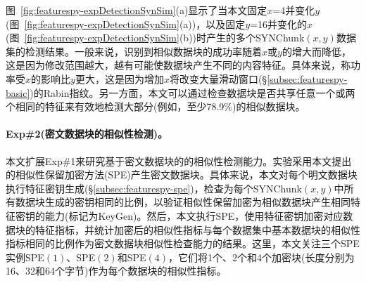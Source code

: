 图~\ref{fig:featurespy-expDetectionSynSim}(a)显示了当本文固定$x$=4并变化$y$(图~\ref{fig:featurespy-expDetectionSynSim}(a))，以及固定$y$=16并变化的$x$(图~\ref{fig:featurespy-expDetectionSynSim}(b))时产生的多个SYNChunk$(x, y)$数据集的检测结果。一般来说，识别到相似数据块的成功率随着$x$或$y$的增大而降低，这是因为修改范围越大，越有可能使数据块产生不同的内容特征。具体来说，称功率受$x$的影响比$y$更大，这是因为增加$x$将改变大量滑动窗口(\S\ref{subsec:featurespy-basic})的Rabin指纹。另一方面，本文可以通过检查数据块是否共享任意一个或两个相同的特征来有效地检测大部分(例如，至少78.9\%)的相似数据块。

\paragraph*{Exp\#2(密文数据块的相似性检测)。}
本文扩展Exp\#1来研究\sysnameF 基于密文数据块的的相似性检测能力。实验采用本文提出的相似性保留加密方法(SPE)产生密文数据块。具体来说，本文对每个明文数据块执行特征密钥生成(\S\ref{subsec:featurespy-spe})，检查为每个SYNChunk$(x, y)$中所有数据块生成的密钥相同的比例，以验证相似性保留加密为相似数据块产生相同特征密钥的能力(标记为KeyGen)。然后，本文执行SPE，使用特征密钥加密对应数据块的特征指标，并统计加密后的相似性指标与每个数据集中基本数据块的相似性指标相同的比例作为密文数据块相似性检查能力的结果。这里，本文关注三个SPE实例SPE$(1)$、SPE$(2)$和SPE$(4)$，它们将1个、2个和4个加密块(长度分别为16、32和64个字节)作为每个数据块的相似性指标。

